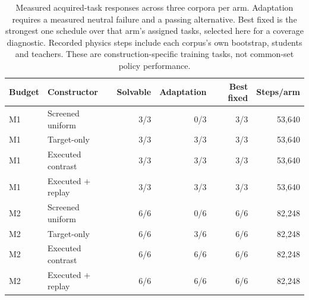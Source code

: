 \begin{table}[t]
\centering\small
\begin{tabular}{llrrrr}
\toprule
Budget & Constructor & Solvable & Adaptation & Best fixed & Steps/arm \\
\midrule
M1 & Screened uniform & 3/3 & 0/3 & 3/3 & 53,640 \\
M1 & Target-only & 3/3 & 3/3 & 3/3 & 53,640 \\
M1 & Executed contrast & 3/3 & 3/3 & 3/3 & 53,640 \\
M1 & Executed + replay & 3/3 & 3/3 & 3/3 & 53,640 \\
M2 & Screened uniform & 6/6 & 0/6 & 6/6 & 82,248 \\
M2 & Target-only & 6/6 & 3/6 & 6/6 & 82,248 \\
M2 & Executed contrast & 6/6 & 6/6 & 6/6 & 82,248 \\
M2 & Executed + replay & 6/6 & 6/6 & 6/6 & 82,248 \\
\bottomrule
\end{tabular}
\caption{Measured acquired-task responses across three corpora per arm. Adaptation requires a measured neutral failure and a passing alternative. Best fixed is the strongest one schedule over that arm's assigned tasks, selected here for a coverage diagnostic. Recorded physics steps include each corpus's own bootstrap, students and teachers. These are construction-specific training tasks, not common-set policy performance.}
\label{tab:acquisitionyield}
\end{table}
